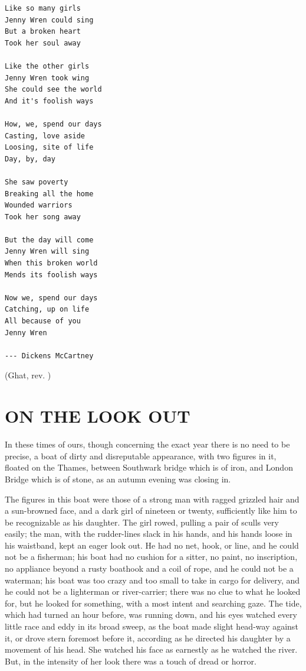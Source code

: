 \documentclass[12pt]{book}
\begin{document}
\begin{verbatim}
Like so many girls
Jenny Wren could sing
But a broken heart
Took her soul away

Like the other girls
Jenny Wren took wing
She could see the world
And it's foolish ways

How, we, spend our days
Casting, love aside
Loosing, site of life
Day, by, day

She saw poverty
Breaking all the home
Wounded warriors
Took her song away

But the day will come
Jenny Wren will sing
When this broken world
Mends its foolish ways

Now we, spend our days
Catching, up on life
All because of you
Jenny Wren

--- Dickens McCartney
\end{verbatim}

(Ghat, rev. \rev)

\newpage


\chapter{ON THE LOOK OUT}

In these times of ours, though concerning the exact year there is no
need to be precise, a boat of dirty and disreputable appearance,
with two figures in it, floated on the Thames, between Southwark
bridge which is of iron, and London Bridge which is of stone, as an
autumn evening was closing in.

The figures in this boat were those of a strong man with ragged
grizzled hair and a sun-browned face, and a dark girl of nineteen or
twenty, sufficiently like him to be recognizable as his daughter.
The girl rowed, pulling a pair of sculls very easily; the man, with
the rudder-lines slack in his hands, and his hands loose in his
waistband, kept an eager look out. He had no net, hook, or line,
and he could not be a fisherman; his boat had no cushion for a
sitter, no paint, no inscription, no appliance beyond a rusty
boathook and a coil of rope, and he could not be a waterman; his
boat was too crazy and too small to take in cargo for delivery, and
he could not be a lighterman or river-carrier; there was no clue to
what he looked for, but he looked for something, with a most intent
and searching gaze. The tide, which had turned an hour before,
was running down, and his eyes watched every little race and eddy
in its broad sweep, as the boat made slight head-way against it, or
drove stern foremost before it, according as he directed his
daughter by a movement of his head. She watched his face as
earnestly as he watched the river. But, in the intensity of her look
there was a touch of dread or horror.
\end{document}
